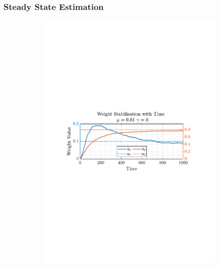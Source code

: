 \documentclass[12pt]{article}
\numberwithin{equation}{section}
\begin{document}
		\subsubsection{Steady State Estimation} 
			\begin{figure}[H]
				\centering
				\begin{subfigure}{0.49\textwidth}
					\centering
					\includegraphics[trim={2.2cm 11.2cm 3.00cm  11.2cm}, clip, width=\textwidth]{../MATLAB/figures/q2_1cd_fig02.pdf} 
					\captionsetup{justification=centering}
				\end{subfigure}
				\begin{subfigure}{0.49\textwidth}
					\centering

\end{subfigure}
\end{figure}
\end{document}
